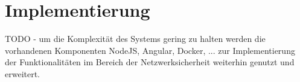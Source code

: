 \chapter{Implementierung}

TODO - um die Komplexität des Systems gering zu halten werden die vorhandenen Komponenten NodeJS, Angular, Docker, ... zur Implementierung der Funktionalitäten im Bereich der Netzwerksicherheit weiterhin genutzt und erweitert.